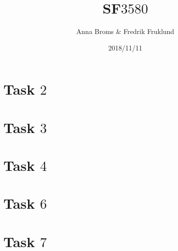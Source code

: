 \documentclass[a4paper]{article}
\title{SF$3580$}
\author{Anna Broms \& Fredrik Fruklund}
\date{2018/11/11}
\begin{document}
\maketitle

\section{Task $2$}



\section{Task $3$}


\section{Task $4$}

\section{Task $6$}

\section{Task $7$}






\end{document}
